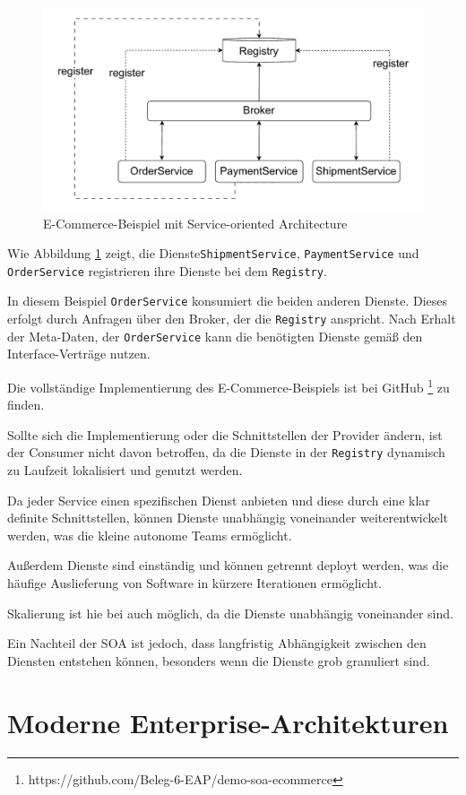 \documentclass[acmtog]{acmart}
\begin{document}
\begin{figure}[!h]
  \centering
  \includegraphics[width=0.8\linewidth]{images/soa/soa-example.pdf}
  \caption{E-Commerce-Beispiel mit Service-oriented Architecture}
  \label{fig:soaecommerce}
\end{figure}

Wie Abbildung \ref{fig:soaecommerce} zeigt, die Dienste\texttt{ShipmentService},
\texttt{PaymentService} und \texttt{OrderService} registrieren ihre Dienste
bei dem \texttt{Registry}.

In diesem Beispiel \texttt{OrderService} konsumiert die beiden anderen Dienste.
 Dieses erfolgt durch Anfragen über den Broker, der die \texttt{Registry} anspricht.
Nach Erhalt der Meta-Daten, der \texttt{OrderService} kann die benötigten Dienste
 gemäß den Interface-Verträge nutzen.

Die vollständige Implementierung des E-Commerce-Beispiels ist bei GitHub \footnote{https://github.com/Beleg-6-EAP/demo-soa-ecommerce} zu finden.

Sollte sich die Implementierung oder die Schnittstellen der Provider ändern, ist
der Consumer nicht davon betroffen, da die Dienste in der \texttt{Registry}
 dynamisch zu Laufzeit lokalisiert und genutzt werden.

Da jeder Service einen spezifischen Dienst anbieten und diese durch eine
 klar definite Schnittstellen, können Dienste unabhängig voneinander
 weiterentwickelt werden, was die kleine autonome Teams ermöglicht.

Außerdem Dienste sind einständig und können getrennt deployt werden,
 was die häufige Auslieferung von Software in kürzere Iterationen ermöglicht.

Skalierung ist hie bei auch möglich, da die Dienste unabhängig voneinander sind.

Ein Nachteil der SOA ist jedoch, dass langfristig Abhängigkeit zwischen den Diensten
entstehen können, besonders wenn die Dienste grob granuliert sind.
\section{Moderne Enterprise-Architekturen}
\end{document}
